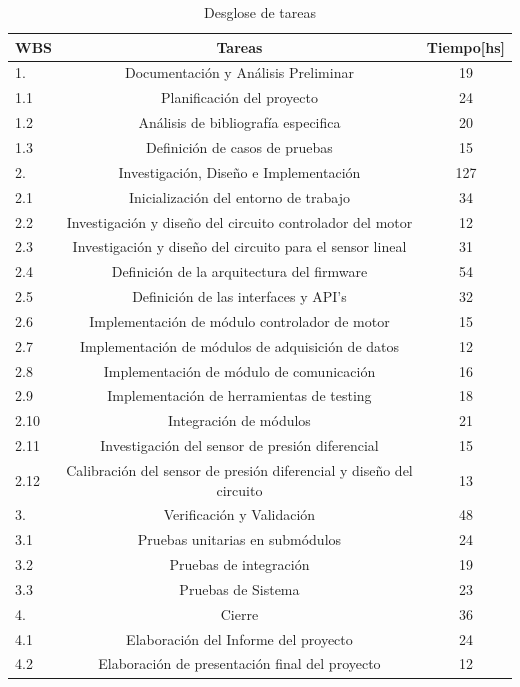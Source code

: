 \begin{table}[h]
	\centering
	\caption[Desglose de tareas]{Desglose de tareas}
	\begin{tabular}{l c c}    
		\toprule
		\textbf{WBS}  & \textbf{Tareas} 	 & \textbf{Tiempo[hs]}\\
		\midrule
		1.   & Documentación y Análisis Preliminar	&  19 \\		
		1.1  & Planificación del proyecto			&  24 \\
		1.2  & Análisis de bibliografía especifica &  20 \\
		1.3  & Definición de casos de pruebas		&  15 \\
		2.   & Investigación, Diseño e Implementación & 127 \\
		2.1  & Inicialización del entorno de trabajo  & 34\\
		2.2  & Investigación y diseño del circuito controlador del motor & 12\\
		2.3 & Investigación y diseño del circuito para el sensor lineal &31\\
		2.4 & Definición de la arquitectura del firmware & 54\\
		2.5 & Definición de las interfaces y API’s  &32\\
		2.6 & Implementación de módulo controlador de motor &15\\
		2.7 & Implementación de módulos de adquisición de datos &12\\
		2.8 & Implementación de módulo de comunicación & 16\\
		2.9 & Implementación de herramientas de testing & 18\\
		2.10 & Integración de módulos & 21\\
		2.11 & Investigación  del sensor de presión diferencial & 15\\
		2.12 & Calibración del sensor de presión diferencial y diseño del circuito &13\\
		3. & Verificación y Validación & 48\\
		3.1 & Pruebas unitarias en submódulos &24\\
		3.2 & Pruebas de integración &19\\
		3.3 & Pruebas de Sistema &23\\
		4. & Cierre & 36\\
		4.1 & Elaboración del Informe del proyecto & 24\\
		4.2 & Elaboración de presentación final del proyecto &12\\
		\bottomrule
		\hline
	\end{tabular}
	\label{tab:seccplanificacion}
\end{table}

